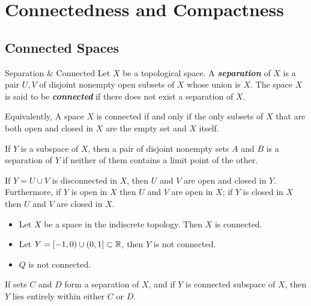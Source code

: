 \documentclass[12pt,a4paper]{article}
\begin{document}
    \newpage
    \section{Connectedness and Compactness}
    \subsection{Connected Spaces}
    \begin{defi}{Separation \& Connected}
        Let $X$ be a topological space. A \textbf{\textit{separation}} of $X$ is a pair $U,V$ of disjoint nonempty open subsets of $X$ whose union is $X$. The space $X$ is said to be \textbf{\textit{connected}} if there does not exist a separation of $X$.
    \end{defi}
    \begin{remark}
        Equivalently, A space $X$ is connected if and only if the only subsets of $X$ that are both open and closed in $X$ are the empty set and $X$ itself. 
    \end{remark}
    \hfill

    \begin{lemma}
        If $Y$ is a subspace of $X$, then a pair of disjoint nonempty sets $A$ and $B$ is a separation of $Y$ if neither of them contains a limit point of the other.
    \end{lemma}
    \begin{remark}
        If $Y=U\cup V$ is disconnected in $X$, then $U$ and $V$ are open and closed in $Y$. Furthermore, if $Y$ is open in $X$ then $U$ and $V$ are open in $X$; if $Y$ is closed in $X$ then $U$ and $V$ are closed in $X$.
    \end{remark}
    \hfill

    \begin{eg}\hfill
    
        \begin{itemize}
            \item Let $X$ be a space in the indiscrete topology. Then $X$ is connected.
            \item Let $Y=[-1,0)\cup(0,1]\subset\mathbb{R}$, then $Y$ is not connected.
            \item $Q$ is not connected.
        \end{itemize}
    \end{eg}
    \hfill

    \begin{lemma}
        If sets $C$ and $D$ form a separation of $X$, and if $Y$ is connected subspace of $X$, then $Y$ lies entirely within either $C$ or $D$.
    \end{lemma}
    \hfill
\end{document}
